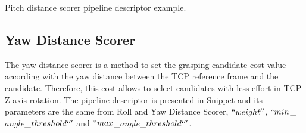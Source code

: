 

\begin{snippet}[h!]
\centering
{}
\caption{Pitch distance scorer pipeline descriptor example.}
\label{code:pitch_distance_scorer}
\end{snippet}

\subsection{Yaw Distance Scorer}
\label{cap4:modular_grasping_architecture:sec:grasp_selection:subsec:yaw_distance}

The yaw distance scorer is a method to set the grasping candidate cost value according with the yaw distance between the TCP reference frame and the candidate. Therefore, this cost allows to select candidates with less effort in TCP Z-axis rotation. The pipeline descriptor is presented in Snippet and its parameters are the same from Roll and Yaw Distance Scorer, $``weight''$, $``min$\_$angle$\_$threshold`''$ and $``max$\_$angle$\_$threshold`''$.



